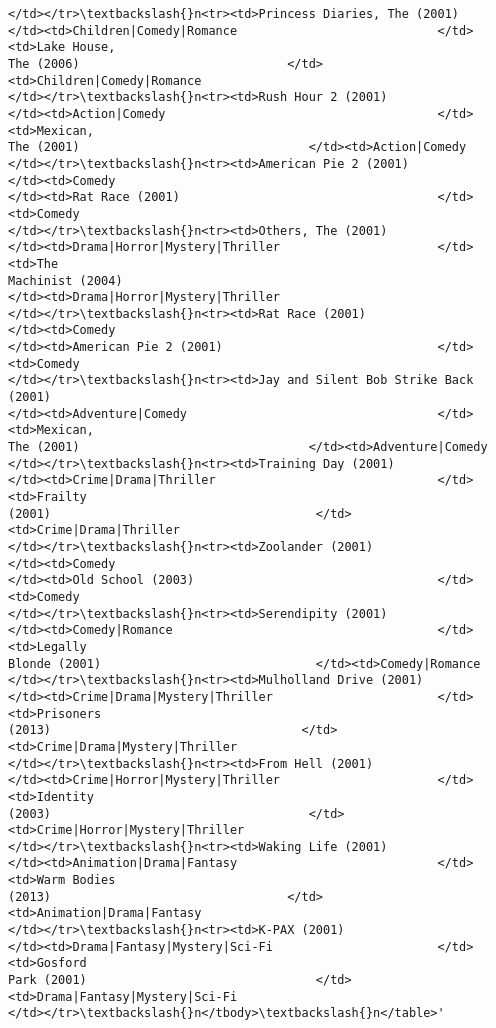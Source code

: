 \documentclass[11pt]{article}
\begin{document}
\begin{tcolorbox}[breakable, size=fbox, boxrule=.5pt, pad at break*=1mm, opacityfill=0]
\begin{Verbatim}[commandchars=\\\{\}]
</td></tr>\textbackslash{}n<tr><td>Princess Diaries, The (2001)
</td><td>Children|Comedy|Romance                            </td><td>Lake House,
The (2006)                             </td><td>Children|Comedy|Romance
</td></tr>\textbackslash{}n<tr><td>Rush Hour 2 (2001)
</td><td>Action|Comedy                                      </td><td>Mexican,
The (2001)                                </td><td>Action|Comedy
</td></tr>\textbackslash{}n<tr><td>American Pie 2 (2001)                   </td><td>Comedy
</td><td>Rat Race (2001)                                    </td><td>Comedy
</td></tr>\textbackslash{}n<tr><td>Others, The (2001)
</td><td>Drama|Horror|Mystery|Thriller                      </td><td>The
Machinist (2004)
</td><td>Drama|Horror|Mystery|Thriller
</td></tr>\textbackslash{}n<tr><td>Rat Race (2001)                         </td><td>Comedy
</td><td>American Pie 2 (2001)                              </td><td>Comedy
</td></tr>\textbackslash{}n<tr><td>Jay and Silent Bob Strike Back (2001)
</td><td>Adventure|Comedy                                   </td><td>Mexican,
The (2001)                                </td><td>Adventure|Comedy
</td></tr>\textbackslash{}n<tr><td>Training Day (2001)
</td><td>Crime|Drama|Thriller                               </td><td>Frailty
(2001)                                     </td><td>Crime|Drama|Thriller
</td></tr>\textbackslash{}n<tr><td>Zoolander (2001)                        </td><td>Comedy
</td><td>Old School (2003)                                  </td><td>Comedy
</td></tr>\textbackslash{}n<tr><td>Serendipity (2001)
</td><td>Comedy|Romance                                     </td><td>Legally
Blonde (2001)                              </td><td>Comedy|Romance
</td></tr>\textbackslash{}n<tr><td>Mulholland Drive (2001)
</td><td>Crime|Drama|Mystery|Thriller                       </td><td>Prisoners
(2013)                                   </td><td>Crime|Drama|Mystery|Thriller
</td></tr>\textbackslash{}n<tr><td>From Hell (2001)
</td><td>Crime|Horror|Mystery|Thriller                      </td><td>Identity
(2003)                                    </td><td>Crime|Horror|Mystery|Thriller
</td></tr>\textbackslash{}n<tr><td>Waking Life (2001)
</td><td>Animation|Drama|Fantasy                            </td><td>Warm Bodies
(2013)                                 </td><td>Animation|Drama|Fantasy
</td></tr>\textbackslash{}n<tr><td>K-PAX (2001)
</td><td>Drama|Fantasy|Mystery|Sci-Fi                       </td><td>Gosford
Park (2001)                                </td><td>Drama|Fantasy|Mystery|Sci-Fi
</td></tr>\textbackslash{}n</tbody>\textbackslash{}n</table>'
\end{Verbatim}
\end{tcolorbox}
        
\end{document}

